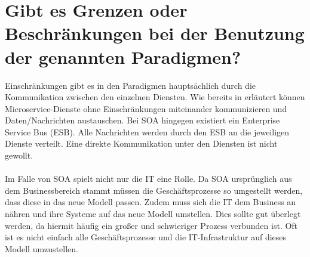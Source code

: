 \section{Gibt es Grenzen oder Beschränkungen bei der Benutzung der genannten Paradigmen?}
\label{sec:Beschraenkungen}
Einschränkungen gibt es in den Paradigmen hauptsächlich durch die Kommunikation zwischen den einzelnen Diensten. Wie bereits in  erläutert können Microservice-Dienste ohne Einschränkungen miteinander kommunizieren und Daten/Nachrichten austauschen. Bei SOA hingegen existiert ein Enterprise Service Bus (ESB). Alle Nachrichten werden durch den ESB an die jeweiligen Dienste verteilt. Eine direkte Kommunikation unter den Diensten ist nicht gewollt.
\\\\
Im Falle von SOA spielt nicht nur die IT eine Rolle. Da SOA ursprünglich aus dem Businessbereich stammt müssen die Geschäftsprozesse so umgestellt werden, dass diese in das neue Modell passen. Zudem muss sich die IT dem Business an nähren und ihre Systeme auf das neue Modell umstellen. Dies sollte gut überlegt werden, da hiermit häufig ein großer und schwieriger Prozess verbunden ist. Oft ist es nicht einfach alle Geschäftsprozesse und die IT-Infrastruktur auf dieses Modell umzustellen.

